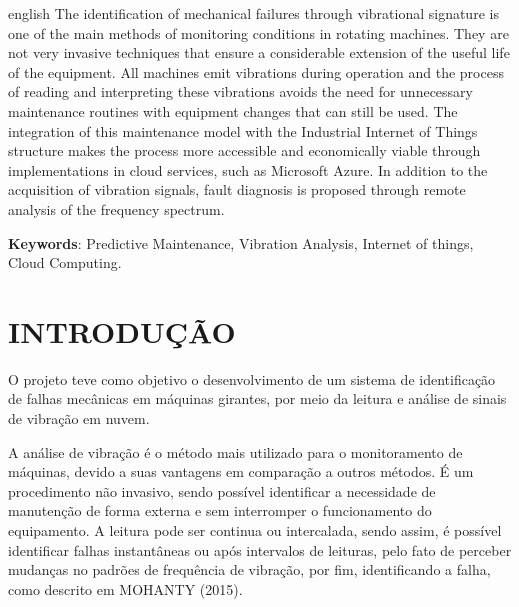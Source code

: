 \documentclass[
	article,			%
	12pt,				%
	oneside,			%
	a4paper,			%
	section=TITLE,		%
	subsection=TITLE,	%
	english,			%
	brazil,				%
	sumario=tradicional
	]{abntex2}
\begin{document}
\begin{resumo}
 \begin{otherlanguage*}{english}
The identification of mechanical failures through vibrational signature is one of the main methods of monitoring conditions in rotating machines. They are not very invasive techniques that ensure a considerable extension of the useful life of the equipment. All machines emit vibrations during operation and the process of reading and interpreting these vibrations avoids the need for unnecessary maintenance routines with equipment changes that can still be used. The integration of this maintenance model with the Industrial Internet of Things structure makes the process more accessible and economically viable through implementations in cloud services, such as Microsoft Azure. In addition to the acquisition of vibration signals, fault diagnosis is proposed through remote analysis of the frequency spectrum.
   \vspace{\onelineskip}
 
   \noindent 
   \textbf{Keywords}: Predictive Maintenance, Vibration Analysis, Internet of things, Cloud Computing.
 \end{otherlanguage*}
\end{resumo}


\newpage
\textual
\pagestyle{estiloUFCG}

\section*{INTRODUÇÃO}

O projeto  teve como objetivo o desenvolvimento de um sistema de identificação de falhas mecânicas em máquinas girantes, por meio da leitura e análise de sinais de vibração em nuvem. 

A análise de vibração é o método mais utilizado para o monitoramento de máquinas, devido a suas vantagens em comparação a outros métodos. É um procedimento não invasivo, sendo possível identificar a  necessidade de manutenção de forma externa e sem interromper o funcionamento do equipamento. A leitura pode ser continua ou intercalada, sendo assim, é possível identificar falhas instantâneas ou após intervalos de leituras, pelo fato de perceber mudanças no padrões de frequência de vibração, por fim, identificando a falha, como  descrito em MOHANTY (2015). 
\end{document}
